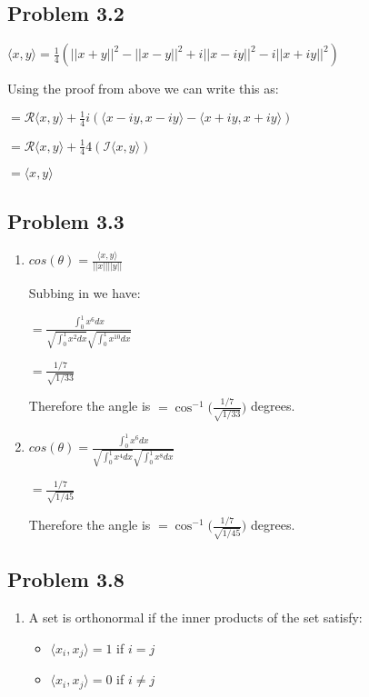 \documentclass[letterpaper,12pt]{article}
\theoremstyle{definition}
\begin{document}
\begin{spacing}{1.3}{}
\subsection*{Problem 3.2}

	\setlength{\leftskip}{20pt}

	$\langle x, y \rangle = \frac{1}{4}(||x + y||^2 - ||x - y||^2 + i||x - iy||^2 - i||x + iy||^2)$

	Using the proof from above we can write this as:

	$= \mathcal{R} \langle x, y \rangle +\frac{1}{4}i(\langle x-iy, x-iy \rangle - \langle x+iy, x+iy \rangle)$

	$= \mathcal{R} \langle x, y \rangle +\frac{1}{4}4( \mathcal{I} \langle x, y \rangle)$

	$= \langle x, y \rangle$

	\setlength{\leftskip}{0pt}

\subsection*{Problem 3.3}

\begin{enumerate}
  \item
  $cos(\theta) = \frac{\langle x, y \rangle}{||x|| ||y||}$

	Subbing in we have:

	$= \frac{\int_{0}^{1} x^6 dx}{\sqrt{\int_{0}^{1} x^2 dx}\sqrt{\int_{0}^{1} x^10 dx}}$

	$= \frac{1/7}{\sqrt{1/33}}$

	Therefore the angle is $= \cos^{-1} \bigg(\frac{1/7}{\sqrt{1/33}}\bigg)$ degrees.
  \item
  $cos(\theta) = \frac{\int_{0}^{1}x^6 dx}{\sqrt{\int_{0}^{1}x^4 dx}\sqrt{\int_{0}^{1}x^8 dx}}$

	$= \frac{1/7}{\sqrt{1/45}}$

	Therefore the angle is $= \cos^{-1} \bigg(\frac{1/7}{\sqrt{1/45}}\bigg)$ degrees.

\end{enumerate}


\subsection*{Problem 3.8}

\begin{enumerate}
  \item
  	A set is orthonormal if the inner products of the set satisfy:
	\begin{itemize}
		\item $\langle x_{i}, x_{j} \rangle = 1$ if $i=j$
		\item $\langle x_{i}, x_{j} \rangle = 0$ if $i \neq j$
	\end{itemize}


\end{enumerate}
\end{spacing}
\end{document}
